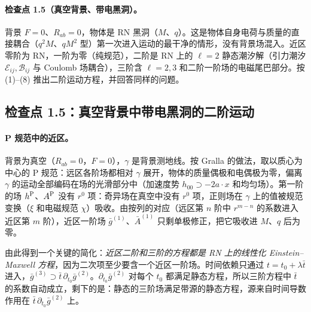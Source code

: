 \documentclass[11pt,a4paper]{ctexart}
\numberwithin{equation}{section}
\begin{document}
\paragraph{检查点 1.5（真空背景、带电黑洞）。}背景 $F=0$、$R_{ab}=0$，物体是 RN 黑洞（$M$、$q$）。这是物体自身电荷与质量的直接耦合（$q^2M$、$qM^2$ 型）第一次进入运动的最干净的情形，没有背景场混入。近区零阶为 RN，一阶为零（纯规范），二阶是 RN 上的 $\ell=2$ 静态潮汐解（引力潮汐 $\mathcal E_{ij},\mathcal B_{ij}$ 与 Coulomb 场耦合），三阶含 $\ell=2,3$ 和二阶一阶场的电磁尾巴部分。按 (1)--(8) 推出二阶运动方程，并回答同样的问题。

\subsection{检查点 1.5：真空背景中带电黑洞的二阶运动}
\label{sec:L6ck15}

\paragraph{P 规范中的近区。}背景为真空（$R_{ab}=0$，$F=0$），$\gamma$ 是背景测地线。按 Gralla 的做法，取以质心为中心的 P 规范：远区各阶场都相对 $\gamma$ 展开，物体的质量偶极和电偶极为零，偏离 $\gamma$ 的运动全部编码在场的光滑部分中（加速度势 $h_{00}\supset-2a\cdot x$ 和均匀场）。第一阶的场 $h^{\rm P}$、$A^{\rm P}$ 没有 $r^0$ 项：奇异场在真空中没有 $r^0$ 项，正则场在 $\gamma$ 上的值被规范变换（$\xi$ 和电磁规范 $\chi$）吸收。由按列的对应（远区第 $n$ 阶中 $r^{m-n}$ 的系数进入近区第 $m$ 阶），近区一阶场 $\bar g^{(1)}$、$\bar A^{(1)}$ 只剩单极修正，把它吸收进 $M$、$q$ 后为零。

由此得到一个关键的简化：\emph{近区二阶和三阶的方程都是 RN 上的线性化 Einstein--Maxwell 方程}，因为二次项至少要含一个近区一阶场。时间依赖只通过 $t=t_0+\lambda\bar t$ 进入，$\bar g^{(3)}\supset\bar t\,\partial_{t_0}\bar g^{(2)}$。$\partial_{t_0}\bar g^{(2)}$ 对每个 $t_0$ 都满足静态方程，所以三阶方程中 $\bar t$ 的系数自动成立，剩下的是：静态的三阶场满足带源的静态方程，源来自时间导数作用在 $\bar t\,\partial_{t_0}\bar g^{(2)}$ 上。
\end{document}
